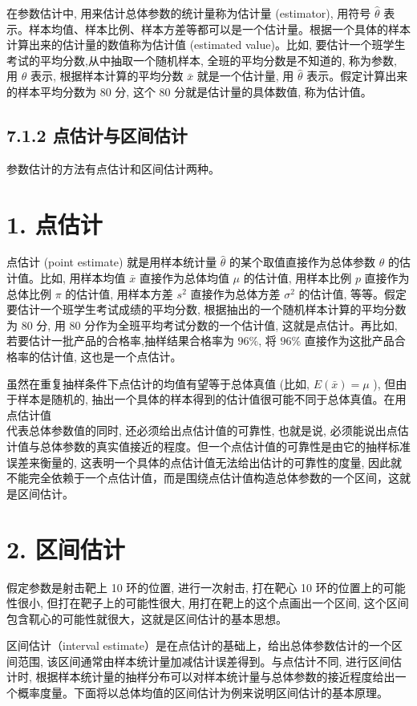 \documentclass[10pt]{article}
\begin{document}
\begin{CJK*}{UTF8}{bsmi}
在参数估计中, 用来估计总体参数的统计量称为估计量 (estimator), 用符号 $\hat{\theta}$ 表示。样本均值、样本比例、样本方差等都可以是一个估计量。根据一个具体的样本计算出来的估计量的数值称为估计值 (estimated value)。比如, 要估计一个班学生考试的平均分数,从中抽取一个随机样本, 全班的平均分数是不知道的, 称为参数, 用 $\theta$ 表示, 根据样本计算的平均分数 $\bar{x}$ 就是一个估计量, 用 $\hat{\theta}$ 表示。假定计算出来的样本平均分数为 80 分, 这个 80 分就是估计量的具体数值, 称为估计值。

\subsection*{7.1.2 点估计与区间估计}
参数估计的方法有点估计和区间估计两种。

\section*{1. 点估计}
点估计 (point estimate) 就是用样本统计量 $\hat{\theta}$ 的某个取值直接作为总体参数 $\theta$ 的估计值。比如, 用样本均值 $\bar{x}$ 直接作为总体均值 $\mu$ 的估计值, 用样本比例 $p$ 直接作为总体比例 $\pi$ 的估计值, 用样本方差 $s^{2}$ 直接作为总体方差 $\sigma^{2}$ 的估计值, 等等。假定要估计一个班学生考试成绩的平均分数, 根据抽出的一个随机样本计算的平均分数为 80 分, 用 80 分作为全班平均考试分数的一个估计值, 这就是点估计。再比如, 若要估计一批产品的合格率,抽样结果合格率为 $96 \%$, 将 $96 \%$ 直接作为这批产品合格率的估计值, 这也是一个点估计。

虽然在重复抽样条件下点估计的均值有望等于总体真值 (比如, $E(\bar{x})=\mu$ ), 但由于样本是随机的, 抽出一个具体的样本得到的估计值很可能不同于总体真值。在用点估计值\\
代表总体参数值的同时, 还必须给出点估计值的可靠性, 也就是说, 必须能说出点估计值与总体参数的真实值接近的程度。但一个点估计值的可靠性是由它的抽样标准误差来衡量的, 这表明一个具体的点估计值无法给出估计的可靠性的度量, 因此就不能完全依赖于一个点估计值，而是围绕点估计值构造总体参数的一个区间，这就是区间估计。

\section*{2. 区间估计}
假定参数是射击靶上 10 环的位置, 进行一次射击, 打在靶心 10 环的位置上的可能性很小, 但打在靶子上的可能性很大, 用打在靶上的这个点画出一个区间, 这个区间包含靰心的可能性就很大，这就是区间估计的基本思想。

区间估计（interval estimate）是在点估计的基础上，给出总体参数估计的一个区间范围, 该区间通常由样本统计量加减估计误差得到。与点估计不同, 进行区间估计时, 根据样本统计量的抽样分布可以对样本统计量与总体参数的接近程度给出一个概率度量。下面将以总体均值的区间估计为例来说明区间估计的基本原理。


\end{CJK*}
\end{document}
